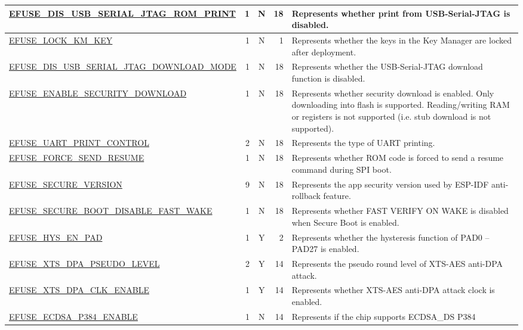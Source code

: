 \begin{longtable}[l]{ |m{8.2cm}|r|c|r|m{9cm}| }
    \hyperref[fielddesc:EFUSEDISUSBSERIALJTAGROMPRINT]{EFUSE\_DIS\_USB\_SERIAL\_JTAG\_ROM\_PRINT} & 1 & N & 18 & Represents whether print from USB-Serial-JTAG is disabled. \\ \hline
    \hyperref[fielddesc:EFUSELOCKKMKEY]{EFUSE\_LOCK\_KM\_KEY} & 1 & N & 1 & Represents whether the keys in the Key Manager are locked after deployment. \\ \hline
    \hyperref[fielddesc:EFUSEDISUSBSERIALJTAGDOWNLOADMODE]{EFUSE\_DIS\_USB\_SERIAL\_JTAG\_DOWNLOAD\_MODE} & 1 & N & 18 & Represents whether the USB-Serial-JTAG download function is disabled. \\ \hline
    \hyperref[fielddesc:EFUSEENABLESECURITYDOWNLOAD]{EFUSE\_ENABLE\_SECURITY\_DOWNLOAD} & 1 & N & 18 & Represents whether security download is enabled. Only downloading into flash is supported. Reading/writing RAM or registers is not supported (i.e. stub download is not supported). \\ \hline
    \hyperref[fielddesc:EFUSEUARTPRINTCONTROL]{EFUSE\_UART\_PRINT\_CONTROL} & 2 & N & 18 & Represents the type of UART printing.  \\ \hline
    \hyperref[fielddesc:EFUSEFORCESENDRESUME]{EFUSE\_FORCE\_SEND\_RESUME} & 1 & N & 18 & Represents whether ROM code is forced to send a resume command during SPI boot. \\ \hline
    \hyperref[fielddesc:EFUSESECUREVERSION]{EFUSE\_SECURE\_VERSION} & 9 & N & 18 & Represents the app security version used by ESP-IDF anti-rollback feature. \\ \hline
    \hyperref[fielddesc:EFUSESECUREBOOTDISABLEFASTWAKE]{EFUSE\_SECURE\_BOOT\_DISABLE\_FAST\_WAKE} & 1 & N & 18 & Represents whether FAST VERIFY ON WAKE is disabled when Secure Boot is enabled. \\ \hline
    \hyperref[fielddesc:EFUSEHYSENPAD]{EFUSE\_HYS\_EN\_PAD} & 1 & Y & 2 & Represents whether the hysteresis function of PAD0 – PAD27 is enabled. \\ \hline
    \hyperref[fielddesc:EFUSEXTSDPAPSEUDOLEVEL]{EFUSE\_XTS\_DPA\_PSEUDO\_LEVEL} & 2 & Y & 14 & Represents the pseudo round level of XTS-AES anti-DPA attack. \\ \hline
    \hyperref[fielddesc:EFUSEXTSDPACLKENABLE]{EFUSE\_XTS\_DPA\_CLK\_ENABLE} & 1 & Y & 14 & Represents whether XTS-AES anti-DPA attack clock is enabled. \\ \hline
    \hyperref[fielddesc:EFUSEECDSAP384ENABLE]{EFUSE\_ECDSA\_P384\_ENABLE} & 1 & N & 14 & Represents if the chip supports ECDSA\_DS P384 \\ \hline

\end{longtable}
